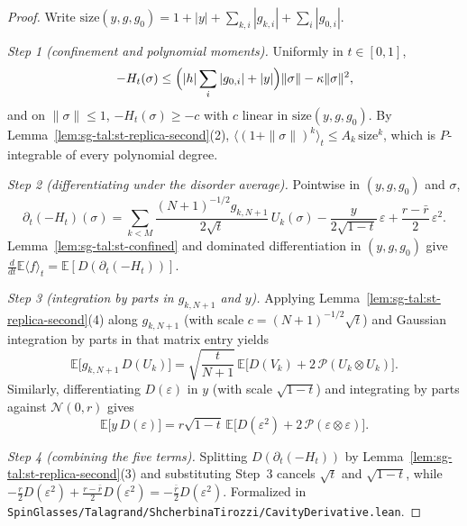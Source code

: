 \begin{proof}
  \leanok
Write $\mathrm{size}(y,g,g_0)=1+|y|+\sum_{k,i}|g_{k,i}|+\sum_i|g_{0,i}|$.

\emph{Step 1 (confinement and polynomial moments).} Uniformly in $t\in[0,1]$,
\[
-H_t(\sigma)\le\Bigl(|h|\sum_i|g_{0,i}|+|y|\Bigr)\|\sigma\|-\kappa\|\sigma\|^2,
\]
and on $\|\sigma\|\le1$, $-H_t(\sigma)\ge-c$ with $c$ linear in $\mathrm{size}(y,g,g_0)$. By
Lemma~\ref{lem:sg-tal:st-replica-second}(2), $\langle(1+\|\sigma\|)^k\rangle_t\le A_k\,\mathrm{size}^k$, which
is $P$-integrable of every polynomial degree.

\emph{Step 2 (differentiating under the disorder average).} Pointwise in $(y,g,g_0)$ and $\sigma$,
\[
\partial_t(-H_t)(\sigma)=\sum_{k<M}\frac{(N+1)^{-1/2}g_{k,N+1}}{2\sqrt t}\,U_k(\sigma)
-\frac{y}{2\sqrt{1-t}}\,\varepsilon+\frac{r-\bar r}{2}\,\varepsilon^2.
\]
Lemma~\ref{lem:sg-tal:st-confined} and dominated differentiation in $(y,g,g_0)$ give
$\frac d{dt}\mathbb E\langle f\rangle_t=\mathbb E[D(\partial_t(-H_t))]$.

\emph{Step 3 (integration by parts in $g_{k,N+1}$ and $y$).} Applying Lemma~\ref{lem:sg-tal:st-replica-second}(4)
along $g_{k,N+1}$ (with scale $c=(N+1)^{-1/2}\sqrt t$) and Gaussian integration by parts in that matrix entry
yields
\[
\mathbb E\bigl[g_{k,N+1}\,D(U_k)\bigr]=\sqrt{\frac t{N+1}}\,\mathbb E\bigl[D(V_k)+2\,\mathcal P(U_k\otimes U_k)\bigr].
\]
Similarly, differentiating $D(\varepsilon)$ in $y$ (with scale $\sqrt{1-t}$) and integrating by parts against
$\mathcal N(0,r)$ gives
\[
\mathbb E\bigl[y\,D(\varepsilon)\bigr]=r\sqrt{1-t}\,\mathbb E\bigl[D(\varepsilon^2)+2\,\mathcal P(\varepsilon\otimes\varepsilon)\bigr].
\]

\emph{Step 4 (combining the five terms).} Splitting $D(\partial_t(-H_t))$ by
Lemma~\ref{lem:sg-tal:st-replica-second}(3) and substituting Step~3 cancels $\sqrt t$ and $\sqrt{1-t}$, while
$-\frac r2 D(\varepsilon^2)+\frac{r-\bar r}2 D(\varepsilon^2)=-\frac{\bar r}2 D(\varepsilon^2)$.
Formalized in \texttt{SpinGlasses/Talagrand/ShcherbinaTirozzi/CavityDerivative.lean}.
\end{proof}

